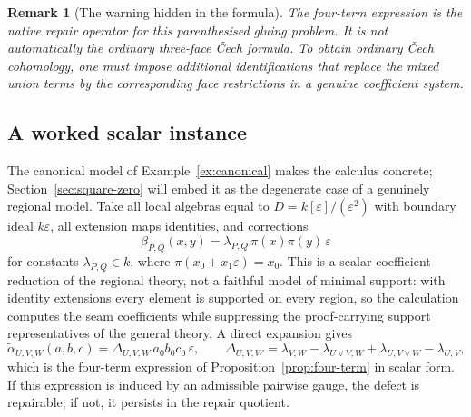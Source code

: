 \documentclass[11pt]{article}
\newtheorem{remark}[theorem]{Remark}
\begin{document}
\begin{remark}[The warning hidden in the formula]
The four-term expression is the native repair operator for this parenthesised gluing problem. It is not automatically the ordinary three-face \v{C}ech formula. To obtain ordinary \v{C}ech cohomology, one must impose additional identifications that replace the mixed union terms by the corresponding face restrictions in a genuine coefficient system.
\end{remark}

\subsection{A worked scalar instance}
\label{sec:interval-example}

The canonical model of Example~\ref{ex:canonical} makes the calculus concrete; Section~\ref{sec:square-zero} will embed it as the degenerate case of a genuinely regional model. Take all local algebras equal to \(D=k[\varepsilon]/(\varepsilon^2)\) with boundary ideal \(k\varepsilon\), all extension maps identities, and corrections
\[
\beta_{P,Q}(x,y)=\lambda_{P,Q}\,\pi(x)\pi(y)\,\varepsilon
\]
for constants \(\lambda_{P,Q}\in k\), where \(\pi(x_0+x_1\varepsilon)=x_0\). This is a scalar coefficient reduction of the regional theory, not a faithful model of minimal support: with identity extensions every element is supported on every region, so the calculation computes the seam coefficients while suppressing the proof-carrying support representatives of the general theory. A direct expansion gives
\[
\widetilde\alpha_{U,V,W}(a,b,c)=\Delta_{U,V,W}\,a_0b_0c_0\,\varepsilon,
\qquad
\Delta_{U,V,W}
=
\lambda_{V,W}-\lambda_{U\vee V,W}+\lambda_{U,V\vee W}-\lambda_{U,V},
\]
which is the four-term expression of Proposition~\ref{prop:four-term} in scalar form. If this expression is induced by an admissible pairwise gauge, the defect is repairable; if not, it persists in the repair quotient.
\end{document}
